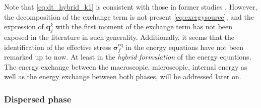Note that \eqref{eq:dt_hybrid_k1} is consistent with those in former studies \citep[Chapter 7]{morel2015mathematical}\citep[Chapter 2]{scorsim2021particle}\citet{kataoka1989basic}. 
However, the decomposition of the exchange term is not present \eqref{eq:exergysource}, and the expression of $\textbf{q}_f^k$ with the first moment of the exchange term has not been exposed in the literature in such generality.
Additionally, it seems that the identification of the effective stress $\bm\sigma^\text{eq}_f$ in the energy equations have not been remarked up to now.
At least in the \textit{hybrid formulation} of the energy equations. 
The energy exchange between the macroscopic, microscopic, internal energy as well as the energy exchange between both phases, will be addressed later on.   


\subsubsection{Dispersed phase}

